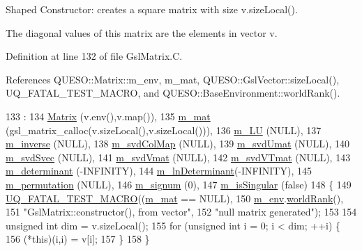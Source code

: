 Shaped Constructor\-: creates a square matrix with size {\ttfamily v.\-size\-Local()}. 

The diagonal values of this matrix are the elements in vector {\ttfamily v}. 

Definition at line 132 of file Gsl\-Matrix.\-C.



References Q\-U\-E\-S\-O\-::\-Matrix\-::m\-\_\-env, m\-\_\-mat, Q\-U\-E\-S\-O\-::\-Gsl\-Vector\-::size\-Local(), U\-Q\-\_\-\-F\-A\-T\-A\-L\-\_\-\-T\-E\-S\-T\-\_\-\-M\-A\-C\-R\-O, and Q\-U\-E\-S\-O\-::\-Base\-Environment\-::world\-Rank().


\begin{DoxyCode}
133   :
134   \hyperlink{class_q_u_e_s_o_1_1_matrix_a2e0493d6ef72c190a7026e1a505488a6}{Matrix}  (v.env(),v.map()),
135   \hyperlink{class_q_u_e_s_o_1_1_gsl_matrix_a2cac0bd065e280a06445f944d5f3e3b3}{m\_mat}          (gsl\_matrix\_calloc(v.sizeLocal(),v.sizeLocal())),
136   \hyperlink{class_q_u_e_s_o_1_1_gsl_matrix_ada9c659bda4c71273af34e79eba4ec81}{m\_LU}           (NULL),
137   \hyperlink{class_q_u_e_s_o_1_1_gsl_matrix_a153dc687fc0ce5f5ff1a5600df6ba914}{m\_inverse}      (NULL),
138   \hyperlink{class_q_u_e_s_o_1_1_gsl_matrix_a0457658d209ab7ac93fd82171e96afa9}{m\_svdColMap}    (NULL),
139   \hyperlink{class_q_u_e_s_o_1_1_gsl_matrix_a764128029cce1c35d7371c6a7faf4161}{m\_svdUmat}      (NULL),
140   \hyperlink{class_q_u_e_s_o_1_1_gsl_matrix_a9c2d46159d01da442aba68fbeecb2dfc}{m\_svdSvec}      (NULL),
141   \hyperlink{class_q_u_e_s_o_1_1_gsl_matrix_a13355e2467b03cf8ff514659802794e0}{m\_svdVmat}      (NULL),
142   \hyperlink{class_q_u_e_s_o_1_1_gsl_matrix_a5aca6b693035268ddcd679affc465d47}{m\_svdVTmat}     (NULL),
143   \hyperlink{class_q_u_e_s_o_1_1_gsl_matrix_a8be32859eb361fe9865d6df3a31aa579}{m\_determinant}  (-INFINITY),
144   \hyperlink{class_q_u_e_s_o_1_1_gsl_matrix_a22b386a1106b9a583edea11bccf15cb9}{m\_lnDeterminant}(-INFINITY),
145   \hyperlink{class_q_u_e_s_o_1_1_gsl_matrix_a673277a250dca216e0e414110f63a9af}{m\_permutation}  (NULL),
146   \hyperlink{class_q_u_e_s_o_1_1_gsl_matrix_a591c6afd472ae02dd79e3a109ded4d51}{m\_signum}       (0),
147   \hyperlink{class_q_u_e_s_o_1_1_gsl_matrix_aa83274d327bb4e668bdeec51e2466c4e}{m\_isSingular}   (\textcolor{keyword}{false})
148 \{
149   \hyperlink{_defines_8h_a56d63d18d0a6d45757de47fcc06f574d}{UQ\_FATAL\_TEST\_MACRO}((\hyperlink{class_q_u_e_s_o_1_1_gsl_matrix_a2cac0bd065e280a06445f944d5f3e3b3}{m\_mat} == NULL),
150                       \hyperlink{class_q_u_e_s_o_1_1_matrix_a247fb0fc0b87fecdee054bb4660b68e8}{m\_env}.\hyperlink{class_q_u_e_s_o_1_1_base_environment_a78b57112bbd0e6dd0e8afec00b40ffa7}{worldRank}(),
151                       \textcolor{stringliteral}{"GslMatrix::constructor(), from vector"},
152                       \textcolor{stringliteral}{"null matrix generated"});
153 
154   \textcolor{keywordtype}{unsigned} \textcolor{keywordtype}{int} dim = v.sizeLocal();
155   \textcolor{keywordflow}{for} (\textcolor{keywordtype}{unsigned} \textcolor{keywordtype}{int} i = 0; i < dim; ++i) \{
156     (*this)(i,i) = v[i];
157   \}
158 \}
\end{DoxyCode}
